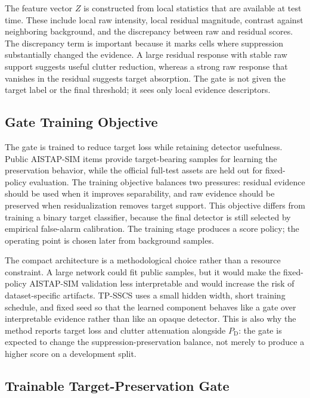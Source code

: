 \documentclass[journal]{IEEEtran}
\begin{document}
The feature vector $Z$ is constructed from local statistics that are available at test time. These include local raw intensity, local residual magnitude, contrast against neighboring background, and the discrepancy between raw and residual scores. The discrepancy term is important because it marks cells where suppression substantially changed the evidence. A large residual response with stable raw support suggests useful clutter reduction, whereas a strong raw response that vanishes in the residual suggests target absorption. The gate is not given the target label or the final threshold; it sees only local evidence descriptors.

\subsection{Gate Training Objective}

The gate is trained to reduce target loss while retaining detector usefulness. Public AISTAP-SIM items provide target-bearing samples for learning the preservation behavior, while the official full-test assets are held out for fixed-policy evaluation. The training objective balances two pressures: residual evidence should be used when it improves separability, and raw evidence should be preserved when residualization removes target support. This objective differs from training a binary target classifier, because the final detector is still selected by empirical false-alarm calibration. The training stage produces a score policy; the operating point is chosen later from background samples.

The compact architecture is a methodological choice rather than a resource constraint. A large network could fit public samples, but it would make the fixed-policy AISTAP-SIM validation less interpretable and would increase the risk of dataset-specific artifacts. TP-SSCS uses a small hidden width, short training schedule, and fixed seed so that the learned component behaves like a gate over interpretable evidence rather than like an opaque detector. This is also why the method reports target loss and clutter attenuation alongside $P_{\mathrm{D}}$: the gate is expected to change the suppression-preservation balance, not merely to produce a higher score on a development split.

\subsection{Trainable Target-Preservation Gate}
\end{document}
